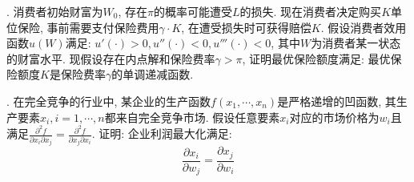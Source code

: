 . 消费者初始财富为$W_0$, 存在$\pi$的概率可能遭受$L$的损失. 现在消费者决定购买$K$单位保险, 事前需要支付保险费用$\gamma \cdot K$, 在遭受损失时可获得赔偿$K$.
假设消费者效用函数$u(W)$满足: $u'(\cdot)>0,u''(\cdot)<0,u'''(\cdot)<0$, 其中$W$为消费者某一状态的财富水平. 现假设存在内点解和保险费率$\gamma>\pi$, 证明最优保险额度满足:
最优保险额度$K$是保险费率$\gamma$的单调递减函数.


. 在完全竞争的行业中, 某企业的生产函数$f(x_1,\cdots,x_n)$是严格递增的凹函数, 其生产要素$x_i,i=1,\cdots,n$都来自完全竞争市场. 
假设任意要素$x_i$对应的市场价格为$w_i$且满足$\frac{\partial^2 f}{\partial x_i\partial x_j}=\frac{\partial^2 f}{\partial x_j\partial x_i}$.
证明: 企业利润最大化满足:
$$\frac{\partial x_i}{\partial w_j}=\frac{\partial x_j}{\partial w_i}$$
